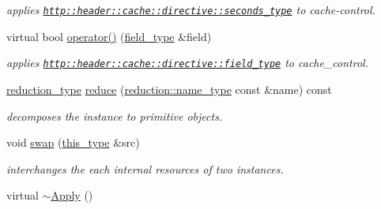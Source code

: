 \begin{DoxyCompactItemize}
\begin{DoxyCompactList}\small\item\em applies \href{http::header::cache::directive::seconds_type}{\tt http\-::header\-::cache\-::directive\-::seconds\-\_\-type} to cache-\/control. \end{DoxyCompactList}\item 
virtual bool \hyperlink{classhryky_1_1http_1_1header_1_1cache_1_1directive_1_1dispatcher_1_1_apply_a89f354d0cd67845f68a01fbf1a73576b}{operator()} (\hyperlink{classhryky_1_1http_1_1header_1_1cache_1_1directive_1_1_field}{field\-\_\-type} \&field)
\begin{DoxyCompactList}\small\item\em applies \href{http::header::cache::directive::field_type}{\tt http\-::header\-::cache\-::directive\-::field\-\_\-type} to cache\-\_\-control. \end{DoxyCompactList}\item 
\hypertarget{classhryky_1_1http_1_1header_1_1cache_1_1directive_1_1dispatcher_1_1_apply_a4e9f44a57a352a9be47d540c017ae28f}{\hyperlink{namespacehryky_a343a9a4c36a586be5c2693156200eadc}{reduction\-\_\-type} \hyperlink{classhryky_1_1http_1_1header_1_1cache_1_1directive_1_1dispatcher_1_1_apply_a4e9f44a57a352a9be47d540c017ae28f}{reduce} (\hyperlink{namespacehryky_1_1reduction_ac686c30a4c8d196bbd0f05629a6b921f}{reduction\-::name\-\_\-type} const \&name) const }\label{classhryky_1_1http_1_1header_1_1cache_1_1directive_1_1dispatcher_1_1_apply_a4e9f44a57a352a9be47d540c017ae28f}

\begin{DoxyCompactList}\small\item\em decomposes the instance to primitive objects. \end{DoxyCompactList}\item 
\hypertarget{classhryky_1_1http_1_1header_1_1cache_1_1directive_1_1dispatcher_1_1_apply_a9c2993519b325e762c038437518089a2}{void \hyperlink{classhryky_1_1http_1_1header_1_1cache_1_1directive_1_1dispatcher_1_1_apply_a9c2993519b325e762c038437518089a2}{swap} (\hyperlink{classhryky_1_1http_1_1header_1_1cache_1_1directive_1_1dispatcher_1_1_apply_ae543280f3793accdffa137bcabf76136}{this\-\_\-type} \&src)}\label{classhryky_1_1http_1_1header_1_1cache_1_1directive_1_1dispatcher_1_1_apply_a9c2993519b325e762c038437518089a2}

\begin{DoxyCompactList}\small\item\em interchanges the each internal resources of two instances. \end{DoxyCompactList}\item 
\hypertarget{classhryky_1_1http_1_1header_1_1cache_1_1directive_1_1dispatcher_1_1_apply_afbcdd7c47dbab9c43e65504d46e892e3}{virtual \hyperlink{classhryky_1_1http_1_1header_1_1cache_1_1directive_1_1dispatcher_1_1_apply_afbcdd7c47dbab9c43e65504d46e892e3}{$\sim$\-Apply} ()}\label{classhryky_1_1http_1_1header_1_1cache_1_1directive_1_1dispatcher_1_1_apply_afbcdd7c47dbab9c43e65504d46e892e3}


\end{DoxyCompactItemize}
